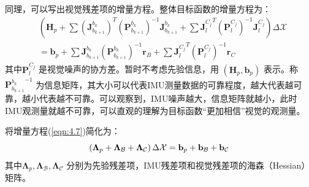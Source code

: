 同理，可以写出视觉残差项的增量方程。整体目标函数的增量方程为：
\begin{equation}
\label{eqn:4.7}
\begin{aligned}
& \left( \mathbf{H}_{p}+\sum (\mathbf{J}_{b_{k+1}}^{b_{k}})^{T} (\mathbf{P}_{b_{k+1}}^{b_{k}})^{-1} \mathbf{J}_{b_{k+1}}^{b_{k}}+\sum {\mathbf{J}_{l}^{C_{j}}}^{T}  (\mathbf{P}_{l}^{C_j})^{-1}  \mathbf{J}_{l}^{C_{j}}\right) \Delta \mathcal{X} \\
& = \mathbf{b}_{p}+\sum \mathbf{J}_{b_{k+1}}^{b_{k}} (\mathbf{P}_{b_{k+1}}^{b_{k}})^{-1} \mathbf{r}_{B}+\sum {\mathbf{J}_{l}^{C_{j}} }^T  (\mathbf{P}_{l}^{C_j})^{-1}  \mathbf{r}_{C}
\end{aligned}
\end{equation}
其中$\mathbf{P}_{l}^{C_{j}} $ 是视觉噪声的协方差。暂时不考虑先验信息，用 $(\mathbf{H}_p, \mathbf{b}_p) $ 表示。称 ${\mathbf{P}_{b_{k+1}}^{b_{k}}}^{-1} $ 为信息矩阵，其大小可以代表IMU测量数据的可靠程度，越大代表越可靠，越小代表越不可靠。可以观察到，IMU噪声越大，信息矩阵就越小，此时IMU观测量就越不可靠，可以直观的理解为目标函数“更加相信”视觉的观测量。

将增量方程(\ref{eqn:4.7})简化为：
\begin{equation}
\label{eqn:4.8}
\setlength{\abovedisplayskip}{6pt}
\setlength{\belowdisplayskip}{6pt}
\left( \bm{\Lambda}_{p}+\bm{\Lambda}_{\mathcal{B}}+\bm{\Lambda}_{\mathcal{C}} \right) \Delta \mathcal{X}=\mathbf{b}_{p}+\mathbf{b}_{\mathcal{B}}+\mathbf{b}_{\mathcal{C}}
\end{equation}
其中$\bm{\Lambda}_{p}, \bm{\Lambda}_{\mathcal{B}}, \bm{\Lambda}_{\mathcal{C}} $ 分别为先验残差项，IMU残差项和视觉残差项的海森（Hessian）矩阵。
